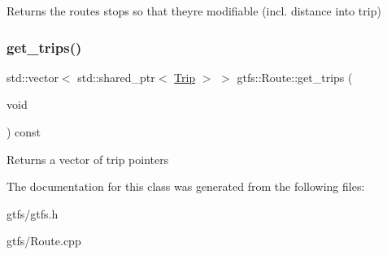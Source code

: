 \begin{DoxyReturn}{Returns}
the route\textquotesingle{}s stops so that they\textquotesingle{}re modifiable (incl. distance into trip) 
\end{DoxyReturn}
\mbox{\label{classgtfs_1_1Route_a763ea7a09f20972019198515da6a1c05}} 
\subsubsection{\texorpdfstring{get\+\_\+trips()}{get\_trips()}}
{\footnotesize\ttfamily std\+::vector$<$ std\+::shared\+\_\+ptr$<$ \hyperlink{classgtfs_1_1Trip}{Trip} $>$ $>$ gtfs\+::\+Route\+::get\+\_\+trips (\begin{DoxyParamCaption}\item[{void}]{ }\end{DoxyParamCaption}) const}

\begin{DoxyReturn}{Returns}
a vector of trip pointers 
\end{DoxyReturn}


The documentation for this class was generated from the following files\+:\begin{DoxyCompactItemize}
\item 
gtfs/gtfs.\+h\item 
gtfs/Route.\+cpp\end{DoxyCompactItemize}
